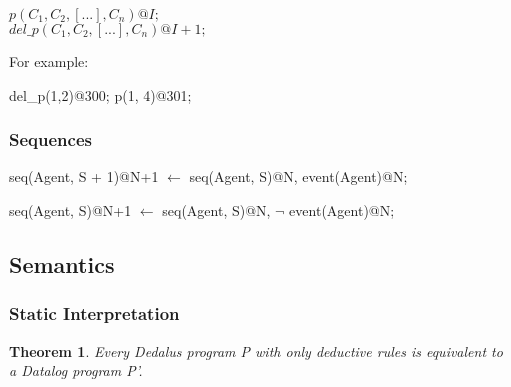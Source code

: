 $p(C_{1},C_{2},[...],C_{n})@I;$
\\
$del\_p(C_{1},C_{2},[...],C_{n})@I+1;$

For example:

\begin{Dedalus}
del\_p(1,2)@300; 
p(1, 4)@301;
\end{Dedalus}

\subsubsection{Sequences}

\begin{Dedalus}
seq(Agent, S + 1)@N+1 \(\leftarrow\)
  seq(Agent, S)@N, 
  event(Agent)@N; 
  
seq(Agent, S)@N+1 \(\leftarrow\) 
  seq(Agent, S)@N, 
  \(\lnot\) event(Agent)@N;
\end{Dedalus}

\subsection{Semantics}


\subsubsection{Static Interpretation}
\newtheorem{theorem}{Theorem}

\begin{theorem}
Every Dedalus program P with only deductive rules is equivalent to a Datalog program P'.
\end{theorem}

